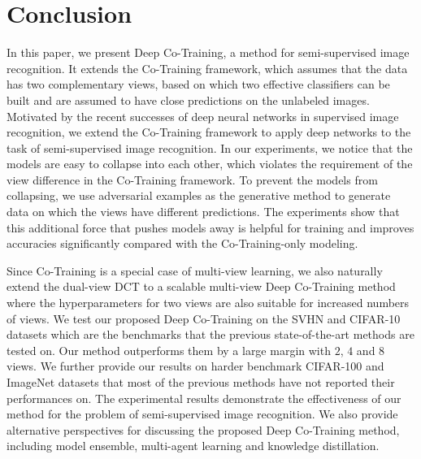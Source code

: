\documentclass[runningheads]{llncs}
\begin{document}
\section{Conclusion}
In this paper, we present Deep Co-Training, a method for semi-supervised image recognition.
It extends the Co-Training framework, which assumes that the data has two complementary views, based on which two effective classifiers
can be built and are assumed to have close predictions on the unlabeled images.
Motivated by the recent successes of deep neural networks in supervised image recognition, we extend the Co-Training framework to apply deep networks to the task of semi-supervised image recognition.
In our experiments, we notice that the models are easy to collapse into each other, which violates the requirement of the view difference in the Co-Training framework.
To prevent the models from collapsing, we use adversarial examples as the generative method to generate data on which the views have different predictions.
The experiments show that this additional force that pushes models away is helpful for training and improves accuracies significantly compared with the Co-Training-only modeling.

Since Co-Training is a special case of multi-view learning, we also naturally extend the dual-view DCT to a scalable multi-view Deep Co-Training method where the hyperparameters for two views are also suitable for increased numbers of views.
We test our proposed Deep Co-Training on the SVHN and CIFAR-10 datasets which are the benchmarks that the previous state-of-the-art methods are tested on.
Our method outperforms them by a large margin with $2$, $4$ and $8$ views.
We further provide our results on harder benchmark CIFAR-100 and ImageNet datasets that most of the previous methods have not reported their performances on.
The experimental results demonstrate the effectiveness of our method for the problem of semi-supervised image recognition.
We also provide alternative perspectives for discussing the proposed Deep Co-Training method, including model ensemble, multi-agent learning and knowledge distillation.



\small


\end{document}

